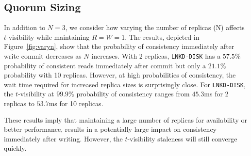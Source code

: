 \documentclass{vldb}
\newcommand{\subsectionskip}{-0em}
\begin{document}
\vspace{\subsectionskip}\subsection{Quorum Sizing}

In addition to $N$$=$$3$, we consider how varying the number of
replicas (N) affects $t$-visibility while maintaining
$R$$=$$W$$=$$1$. The results, depicted in Figure~\ref{fig:varyn}, show
that the probability of consistency immediately after write commit
decreases as $N$ increases.  With 2 replicas, \texttt{LNKD-DISK} has a
$57.5\%$ probability of consistent reads immediately after commit but
only a $21.1\%$ probability with 10 replicas.  However, at high
probabilities of consistency, the wait time required for increased
replica sizes is surprisingly close.  For \texttt{LNKD-DISK}, the
$t$-visibility at $99.9\%$ probability of consistency ranges from
$45.3$ms for 2 replicas to $53.7$ms for 10 replicas.

These results imply that maintaining a large number of replicas for
availability or better performance, results in a potentially large
impact on consistency immediately after writing. However, the
$t$-visibility staleness will still converge quickly.
\end{document}
